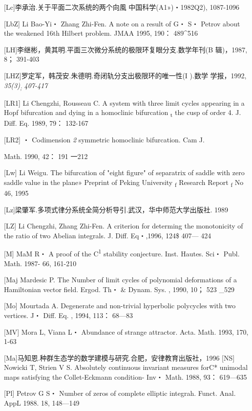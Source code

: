{[}Lc{]}李承治.关于平面二次系统的两个向風 中国科学(A1»)・1982Q2),
1087-1096

{[}LbZ{]} Li Bao-Yi・ Zhang Zhi-Fen. A note on a result of G・ S・
Petrov about the weakened 16th Hilbert problem. JMAA 1995, 190：
489\^{}516

{[}LH{]}李继彬，黄其明.平面三次微分系统的极限环复眼分支.数学年刊(B
辑)，1987, 8； 391-403

{[}LHZ{]}罗定军，韩茂安.朱德明.奇闭轨分支出极限环的唯一性(I ).数学
学报，1992, \emph{35(3)\textsubscript{;} 407-417}

{[}LR1{]} Li Chengzhi, Rousseau C. A system with three limit cycles
appearing in a Hopf bifurcation and dying in a homoclinic bifurcation
\textsubscript{t} the cusp of order 4. J. Diff. Eq. 1989, 79： 132-167

{[}LR2{]} ・ Codimension \emph{2} symmetric homoclinic bifurcation. Cam
J.

Math. 1990, 42： 191 一212

{[}Lw{]} Li Weigu. The bifurcation of "eight figure" of separatrix of
saddle with zero saddle value in the plane» Preprint of Peking
University \textsubscript{f} Research Report \textsubscript{f} No 46,
1995

{[}Lz{]}梁肇军.多项式律分系统全简分析导引.武汉，华中师范大学出版社. 1989

{[}LZ{]} Li Chengzhi, Zhang Zhi-Fen. A criterion for determing the
monotonici­ty of the ratio of two Abelian integrals. J. Diff. Eq・,1996,
124\$ 407--- 424

{[}M{]} MaM R・ A proof of the C\textsuperscript{1} stability
conjecture. Inst. Hautes. Sci・ Publ. Math. 1987- 66, 161-210

{[}Maj Mardesic P. The Number of limit cycles of polynomial deformations
of a Hamiltonian vector field. Ergod. Th・ \& Dynam. Sys. , 1990, 10；
523 \_529

{[}Mo{]} Mourtada A. Degenerate and non-trivial hyperbolic polycycles
with two vertices. J・ Diff. Eq. , 1994, 113： 68---83

{[}MV{]} Mora L, Viana L・ Abundance of strange attractor. Acta. Math.
1993, 170, 1-63

{[}Ma{]}马知恩.种群生态学的数学建模与研究.合肥，安律教育出版社，1996
{[}NS{]} Nowicki T, Strien V S. Absolutely continuous invariant measures
forC* unimodal maps satisfying the Collet-Eckmann condition- Inv・ Math.
1988, 93： 619---635

{[}Pl{]} Petrov G S・ Number of zeros of complete elliptic integrah.
Funct. Anal. AppL 1988. 18, 148---149

